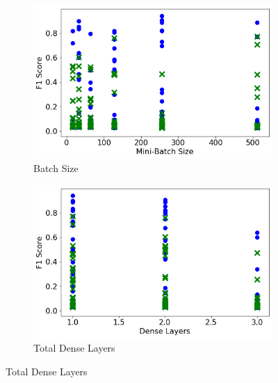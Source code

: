 \begin{figure}[H]
     \begin{subfigure}[b]{0.49\textwidth}
         \centering
         \includegraphics[width=\textwidth]{images/dnn_batch_size.png}
         \caption{Batch Size}
         \label{fig:dnn_batch_size}
     \end{subfigure}
     \hfill
     \begin{subfigure}[b]{0.49\textwidth}
         \centering
         \includegraphics[width=\textwidth]{images/dnn_dense_layers_total.png}
         \caption{Total Dense Layers}
         \label{fig:dnn_dense_layers_total}
     \end{subfigure}


\end{figure}
